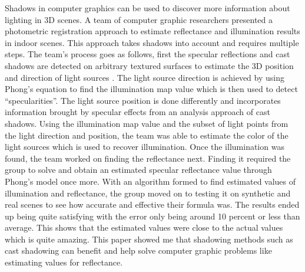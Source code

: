 \documentclass{article}
\begin{document}
Shadows in computer graphics can be used to discover more information about lighting in 3D scenes. A team of computer graphic researchers presented a photometric registration approach to estimate reflectance and illumination results in indoor scenes. This approach takes shadows into account and requires multiple steps. The team’s process goes as follows, first the specular reflections and cast shadows are detected on arbitrary textured surfaces to estimate the 3D position and direction of light sources \cite{9018202}. The light source direction is achieved by using Phong’s equation to find the illumination map value which is then used to detect “specularities”. The light source position is done differently and incorporates information brought by specular effects from an analysis approach of cast shadows. Using the illumination map value and the subset of light points from the light direction and position, the team was able to estimate the color of the light sources which is used to recover illumination. Once the illumination was found, the team worked on finding the reflectance next. Finding it required the group to solve and obtain an estimated specular reflectance value through Phong’s model once more. With an algorithm formed to find estimated values of illumination and reflectance, the group moved on to testing it on synthetic and real scenes to see how accurate and effective their formula was. The results ended up being quite satisfying with the error only being around 10 percent or less than average. This shows that the estimated values were close to the actual values which is quite amazing. This paper showed me that shadowing methods such as cast shadowing can benefit and help solve computer graphic problems like estimating values for reflectance.
\end{document}
